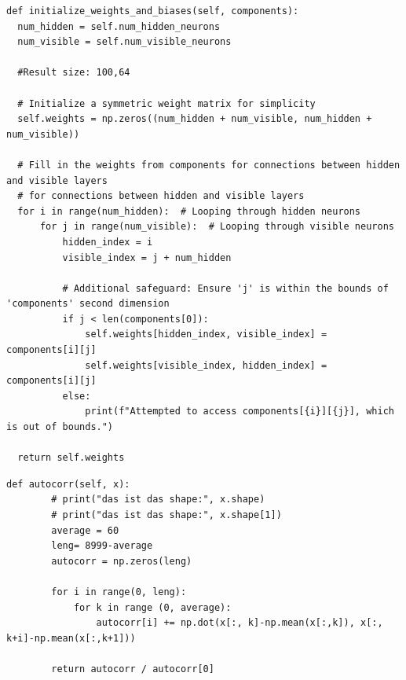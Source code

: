 \label{attachement:weight_matrix}
\begin{lstlisting}
def initialize_weights_and_biases(self, components):
  num_hidden = self.num_hidden_neurons
  num_visible = self.num_visible_neurons

  #Result size: 100,64

  # Initialize a symmetric weight matrix for simplicity
  self.weights = np.zeros((num_hidden + num_visible, num_hidden + num_visible))

  # Fill in the weights from components for connections between hidden and visible layers
  # for connections between hidden and visible layers
  for i in range(num_hidden):  # Looping through hidden neurons
      for j in range(num_visible):  # Looping through visible neurons
          hidden_index = i
          visible_index = j + num_hidden

          # Additional safeguard: Ensure 'j' is within the bounds of 'components' second dimension
          if j < len(components[0]):
              self.weights[hidden_index, visible_index] = components[i][j]
              self.weights[visible_index, hidden_index] = components[i][j]
          else:
              print(f"Attempted to access components[{i}][{j}], which is out of bounds.")

  return self.weights
\end{lstlisting}

\label{attachement:autocorrelation}
\begin{lstlisting}
def autocorr(self, x):
        # print("das ist das shape:", x.shape)
        # print("das ist das shape:", x.shape[1])
        average = 60
        leng= 8999-average
        autocorr = np.zeros(leng)
        
        for i in range(0, leng):
            for k in range (0, average):
                autocorr[i] += np.dot(x[:, k]-np.mean(x[:,k]), x[:, k+i]-np.mean(x[:,k+1])) 

        return autocorr / autocorr[0]
\end{lstlisting}

